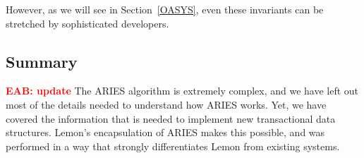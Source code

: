 \documentclass[10pt,letterpaper,twocolumn,english]{article}
\newcommand{\yad}{Lemon\xspace}
\newcommand{\eab}[1]{\textcolor{red}{\bf EAB: #1}}
\begin{document}

However, as we will see in Section~\ref{OASYS}, even these invariants
can be stretched by sophisticated developers.

\subsection{Summary}

\eab{update}
The ARIES algorithm is extremely complex, and we have left
out most of the details needed to understand how ARIES works. Yet, we 
have covered the information that is needed to implement new
transactional data structures.  \yad's encapsulation of ARIES makes 
this possible, and was performed in a way that strongly differentiates
\yad from existing systems.









\end{document}
